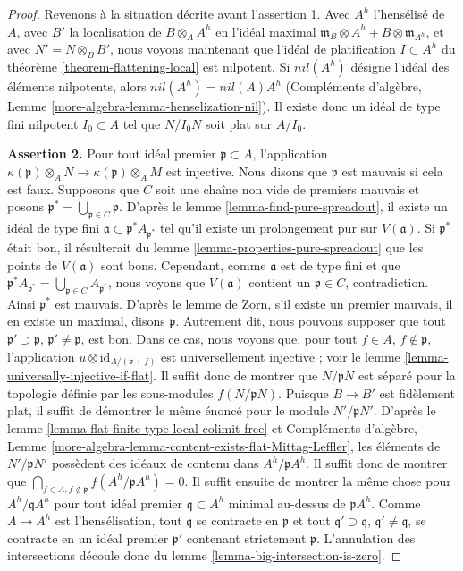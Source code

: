 \begin{proof}
\medskip\noindent
Revenons à la situation décrite avant l'assertion 1. Avec
$A^h$ l'hensélisé de $A$, avec $B'$ la localisation
de $B \otimes_A A^h$ en l'idéal maximal
$\mathfrak m_B \otimes A^h + B \otimes \mathfrak m_{A^h}$, et avec
$N' = N \otimes_B B'$, nous voyons maintenant que l'idéal de platification $I \subset A^h$
du théorème \ref{theorem-flattening-local} est nilpotent.
Si $nil(A^h)$ désigne l'idéal des éléments nilpotents, alors
$nil(A^h) = nil(A) A^h$
(Compléments d'algèbre, Lemme \ref{more-algebra-lemma-henselization-nil}).
Il existe donc un idéal de type fini
nilpotent $I_0 \subset A$ tel que $N/I_0N$ soit plat sur $A/I_0$.

\medskip\noindent
{\bf Assertion 2.} Pour tout idéal premier $\mathfrak p \subset A$,
l'application
$\kappa(\mathfrak p) \otimes_A N \to \kappa(\mathfrak p) \otimes_A M$
est injective. Nous disons que $\mathfrak p$ est mauvais si cela est faux.
Supposons que $C$ soit une chaîne non vide de premiers mauvais et posons
$\mathfrak p^* = \bigcup_{\mathfrak p \in C} \mathfrak p$.
D'après le lemme \ref{lemma-find-pure-spreadout},
il existe un idéal de type fini
$\mathfrak a \subset \mathfrak p^*A_{\mathfrak p^*}$
tel qu'il existe un prolongement pur sur $V(\mathfrak a)$.
Si $\mathfrak p^*$ était bon, il résulterait du
lemme \ref{lemma-properties-pure-spreadout}
que les points de $V(\mathfrak a)$ sont bons.
Cependant, comme $\mathfrak a$ est de type fini et que
$\mathfrak p^*A_{\mathfrak p^*} = \bigcup_{\mathfrak p \in C}A_{\mathfrak p^*}$,
nous voyons que $V(\mathfrak a)$ contient un $\mathfrak p \in C$, contradiction.
Ainsi $\mathfrak p^*$ est mauvais. D'après le lemme de Zorn, s'il existe un
premier mauvais, il en existe un maximal, disons $\mathfrak p$.
Autrement dit, nous pouvons supposer que tout $\mathfrak p' \supset \mathfrak p$,
$\mathfrak p' \not = \mathfrak p$, est bon.
Dans ce cas, nous voyons que, pour tout $f \in A$, $f \not \in \mathfrak p$,
l'application $u \otimes \text{id}_{A/(\mathfrak p + f)}$ est universellement
injective ; voir le lemme \ref{lemma-universally-injective-if-flat}.
Il suffit donc de montrer que $N/\mathfrak p N$ est séparé
pour la topologie définie par les sous-modules $f(N/\mathfrak pN)$.
Puisque $B \to B'$ est fidèlement plat, il suffit de démontrer le
même énoncé pour le module $N'/\mathfrak p N'$.
D'après le lemme \ref{lemma-flat-finite-type-local-colimit-free} et
Compléments d'algèbre, Lemme
\ref{more-algebra-lemma-content-exists-flat-Mittag-Leffler},
les éléments de $N'/\mathfrak pN'$ possèdent des idéaux de contenu dans $A^h/\mathfrak pA^h$.
Il suffit donc de montrer que
$\bigcap_{f \in A, f \not \in \mathfrak p} f(A^h/\mathfrak p A^h) = 0$.
Il suffit ensuite de montrer la même chose pour
$A^h/\mathfrak q A^h$ pour tout idéal premier $\mathfrak q \subset A^h$
minimal au-dessus de $\mathfrak p A^h$. Comme $A \to A^h$ est l'hensélisation,
tout $\mathfrak q$ se contracte en $\mathfrak p$ et tout
$\mathfrak q' \supset \mathfrak q$, $\mathfrak q' \not = \mathfrak q$,
se contracte en un idéal premier $\mathfrak p'$ contenant strictement $\mathfrak p$.
L'annulation des intersections découle donc du
lemme \ref{lemma-big-intersection-is-zero}.


\end{proof}
